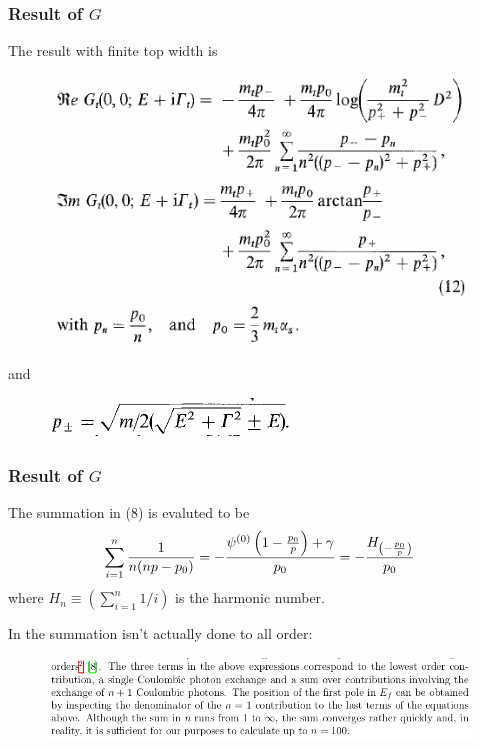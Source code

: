 \documentclass[8pt,dvipsnames,table]{beamer}
\begin{document}
\begin{frame}
	\frametitle{Result of $G$}

	The result with finite top width is
	\begin{figure}[!htb]
		\centering
		\includegraphics[width=.8\linewidth]{image9.png}
		\label{fig:image9}
	\end{figure}
	and
	\begin{figure}[!htb]
		\centering
		\includegraphics[width=.5\linewidth]{image10.png}
		\label{fig:image10}
	\end{figure}


\end{frame}

\begin{frame}
	\frametitle{Result of $G$}

	The summation in (8) is evaluted to be
	\begin{align}
		\sum_{i=1}^n\frac{1}{n(np-p_0)}=-\frac{\psi ^{(0)}\left(1-\frac{p_0}{p}\right)+\gamma }{p_0}=-\frac{H_{\pqty{-\frac{p_0}{p}}}}{p_0}
	\end{align}
	where $H_n\equiv\left(\sum_{i=1}^n1/i\right)$ is the harmonic number.

	In \citep{Bharucha:2016jyr} the summation isn't actually done to all order:
	\begin{figure}[!htb]
		\centering
		\includegraphics[width=\linewidth]{image40.png}
		\label{fig:image40}
	\end{figure}


\end{frame}
\end{document}
